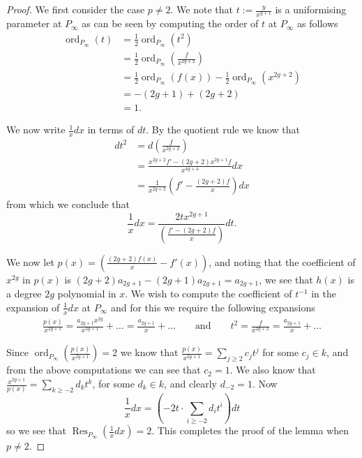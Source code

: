 \documentclass[draft, 11pt]{article} %
\theoremstyle{plain}
\theoremstyle{remark}
\DeclareMathOperator{\res}{Res}
\DeclareMathOperator{\ord}{ord}
\begin{document}
\begin{proof}

We first consider the case $p\neq 2$.
We note that $t:= \frac{y}{x^{g+1}}$ is a uniformising parameter at $P_\infty$ as can be seen by computing the order of $t$ at $P_\infty$ as follows
\begin{align}
\ord_{P_\infty}(t) & =  \frac{1}{2}\ord_{P_\infty}(t^2) \\
  & =  \frac{1}{2}\ord_{P_\infty}\left( \frac{f}{x^{2g+2}} \right) \\
& =  \frac{1}{2}\ord_{P_\infty}(f(x)) - \frac{1}{2}\ord_{P_\infty}(x^{2g+2})\\
& =  -(2g+1) + (2g+2) \\
& =  1.
\end{align}

We now write $\frac{1}{x}dx$ in terms of $dt$.
By the quotient rule we know that
\begin{align*}
dt^2 & =  d \left( \frac{f}{x^{2g+2}} \right) \\
& =  \frac{x^{2g+2}f' - (2g+2)x^{2g+1}f}{x^{4g+4}} dx \\
& =  \frac{1}{x^{2g+2}} \left( f' - \frac{(2g+2)f}{x} \right) dx
\end{align*}
from which we conclude that
\[
\frac{1}{x}dx = \frac{2tx^{2g+1}}{\left(\frac{f' - (2g+2)f}{x} \right)} dt.
\]


We now let $p(x) = \left(\frac{(2g+2)f(x)}{x} - f'(x)\right)$, and noting that the coefficient of $x^{2g}$ in $p(x)$ is $(2g+2)a_{2g+1} - (2g+1)a_{2g+1} = a_{2g+1}$, we see that $h(x)$ is a degree $2g$ polynomial in $x$.
We wish to compute the coefficient of $t^{-1}$ in the expansion of $\frac{1}{x}dx$ at $P_\infty$ and for this we require the following expansions
\begin{align}
\frac{p(x)}{x^{2g+1}} = \frac{a_{2g+1}x^{2g}}{x^{2g+1}} + \ldots = \frac{a_{2g+1}}{x} + \ldots \qquad \text{and} \qquad t^2 = \frac{f}{x^{2g+2} } = \frac{a_{2g+1}}{x} + \ldots
\end{align}

Since $\ord_{P_\infty}\left(\frac{p(x)}{x^{2g+1}}\right) = 2$ we know that $\frac{p(x)}{x^{2g+1}} = \sum_{j\geq 2} c_j t^j$ for some $c_j\in k$, and from the above computations we can see that $c_2 = 1$.
We also know that $\frac{x^{2g+1}}{p(x)} = \sum_{k\geq -2} d_kt^k$, for some $d_k\in k$, and clearly $d_{-2} = 1$.
Now
\[
\frac{1}{x}dx = \left( -2t \cdot \sum_{i\geq -2} d_it^i\right) dt 
\]
so we see that $\res_{P_\infty}\left( \frac{1}{x} dx\right) = 2$.
This completes the proof of the lemma when $p\neq 2$.


\end{proof}
\end{document}
